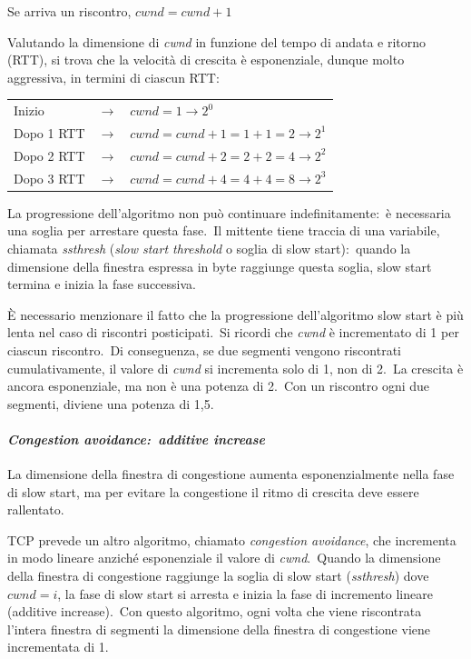 \begin{center}
    Se arriva un riscontro, $cwnd = cwnd +1$
\end{center}

Valutando la dimensione di \emph{cwnd} in funzione del tempo di andata e ritorno (RTT), si trova che la velocità di crescita è esponenziale, dunque molto aggressiva, in termini di ciascun RTT:
\begin{table}[H]
    \centering
    \begin{tabular}{l c l}
        Inizio     & $\rightarrow$ & $cwnd = 1 \rightarrow 2^0$          \\
        Dopo 1 RTT & $\rightarrow$ & $cwnd=cwnd+1=1+1=2 \rightarrow 2^1$ \\
        Dopo 2 RTT & $\rightarrow$ & $cwnd=cwnd+2=2+2=4 \rightarrow 2^2$ \\
        Dopo 3 RTT & $\rightarrow$ & $cwnd=cwnd+4=4+4=8 \rightarrow 2^3$ \\
    \end{tabular}
\end{table}

La progressione dell'algoritmo non può continuare indefinitamente:\ è necessaria una soglia per arrestare questa fase.\
Il mittente tiene traccia di una variabile, chiamata \emph{ssthresh} (\emph{slow start threshold} o soglia di slow start):\ quando la dimensione della finestra espressa in byte raggiunge questa soglia, slow start termina e inizia la fase successiva.

È necessario menzionare il fatto che la progressione dell'algoritmo slow start è più lenta nel caso di riscontri posticipati.\
Si ricordi che \emph{cwnd} è incrementato di 1 per ciascun riscontro.\
Di conseguenza, se due segmenti vengono riscontrati cumulativamente, il valore di \emph{cwnd} si incrementa solo di 1, non di 2.\
La crescita è ancora esponenziale, ma non è una potenza di 2.\
Con un riscontro ogni due segmenti, diviene una potenza di 1,5.

\paragraph{\emph{Congestion avoidance:\ additive increase}} La dimensione della finestra di congestione aumenta esponenzialmente nella fase di slow start, ma per evitare la congestione il ritmo di crescita deve essere rallentato.\

TCP prevede un altro algoritmo, chiamato \emph{congestion avoidance}, che incrementa in modo lineare anziché esponenziale il valore di \emph{cwnd}.\
Quando la dimensione della finestra di congestione raggiunge la soglia di slow start (\emph{ssthresh}) dove $cwnd=i$, la fase di slow start si arresta e inizia la fase di incremento lineare (additive increase).\
Con questo algoritmo, ogni volta che viene riscontrata l'intera finestra di segmenti la dimensione della finestra di congestione viene incrementata di 1.

